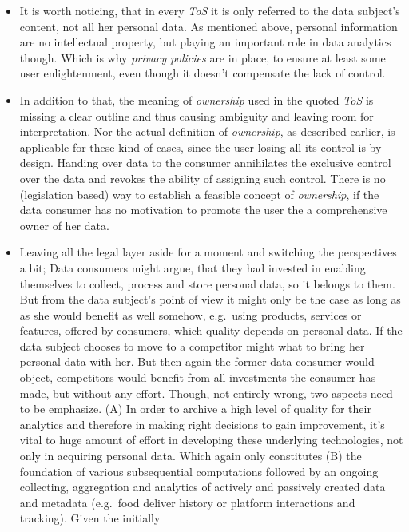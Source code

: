 \documentclass[12pt,english,a4paper,titlepage,cleardoublepage=empty,dottedtoc]{report}
\begin{document}
\begin{itemize}
\item
  It is worth noticing, that in every \emph{ToS} it is only referred to
  the data subject's content, not all her personal data. As mentioned
  above, personal information are no intellectual property, but playing
  an important role in data analytics though. Which is why \emph{privacy
  policies} are in place, to ensure at least some user enlightenment,
  even though it doesn't compensate the lack of control.
\item
  In addition to that, the meaning of \emph{ownership} used in the
  quoted \emph{ToS} is missing a clear outline and thus causing
  ambiguity and leaving room for interpretation. Nor the actual
  definition of \emph{ownership}, as described earlier, is applicable
  for these kind of cases, since the user losing all its control is by
  design. Handing over data to the consumer annihilates the exclusive
  control over the data and revokes the ability of assigning such
  control. There is no (legislation based) way to establish a feasible
  concept of \emph{ownership}, if the data consumer has no motivation to
  promote the user the a comprehensive owner of her data.
\item
  Leaving all the legal layer aside for a moment and switching the
  perspectives a bit; Data consumers might argue, that they had invested
  in enabling themselves to collect, process and store personal data, so
  it belongs to them. But from the data subject's point of view it might
  only be the case as long as as she would benefit as well somehow,
  e.g.~using products, services or features, offered by consumers, which
  quality depends on personal data. If the data subject chooses to move
  to a competitor might what to bring her personal data with her. But
  then again the former data consumer would object, competitors would
  benefit from all investments the consumer has made, but without any
  effort. Though, not entirely wrong, two aspects need to be emphasize.
  (A) In order to archive a high level of quality for their analytics
  and therefore in making right decisions to gain improvement, it's
  vital to huge amount of effort in developing these underlying
  technologies, not only in acquiring personal data. Which again only
  constitutes (B) the foundation of various subsequential computations
  followed by an ongoing collecting, aggregation and analytics of
  actively and passively created data and metadata (e.g.~food deliver
  history or platform interactions and tracking). Given the initially

\end{itemize}
\end{document}
